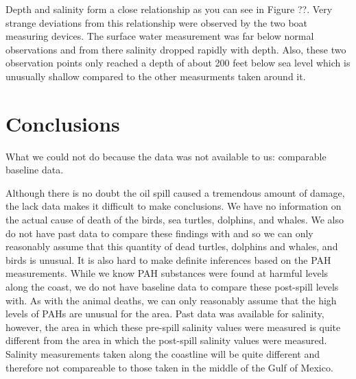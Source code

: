 \documentclass[11pt]{article}
\begin{document}
Depth and salinity form a close relationship as you can see in Figure ??. Very strange deviations from this relationship were observed by the two boat measuring devices. The surface water measurement was far below normal observations and from there salinity dropped rapidly with depth. Also, these two observation points only reached a depth of about 200 feet below sea level which is unusually shallow compared to the other measurments taken around it.

\section{Conclusions}
What we could not do because the data was not available to us: comparable baseline data. 

Although there is no doubt the oil spill caused a tremendous amount of damage, the lack data makes it difficult to make conclusions. We have no information on the actual cause of death of the birds, sea turtles, dolphins, and whales.  We also do not have past data to compare these findings with and so we can only reasonably assume that this quantity of dead turtles, dolphins and whales, and birds is unusual. It is also hard to make definite inferences based on the PAH measurements.  While we know PAH substances were found at harmful levels along the coast, we do not have baseline data to compare these post-spill levels with. As with the animal deaths, we can only reasonably assume that the high levels of PAHs are unusual for the area. Past data was available for salinity, however, the area in which these pre-spill salinity values were measured is quite different from the area in which the post-spill salinity values were measured.  Salinity measurements taken along the coastline will be quite different and therefore not compareable to those taken in the middle of the Gulf of Mexico. 
\end{document}
